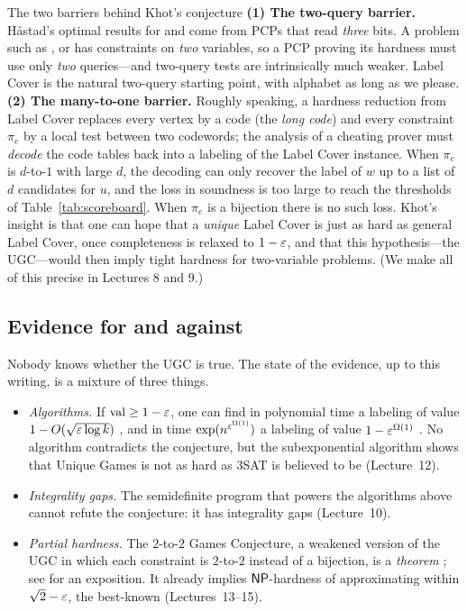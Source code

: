 \begin{bigpicture}{The two barriers behind Khot's conjecture}
\textbf{(1) The two-query barrier.}  H\aa stad's optimal results for  and  come
from PCPs that read \emph{three} bits.  A problem such as ,  or
 has constraints on \emph{two} variables, so a PCP proving its hardness
must use only \emph{two} queries---and two-query tests are intrinsically much weaker.
Label Cover is the natural two-query starting point, with alphabet as long as we please.
\textbf{(2) The many-to-one barrier.}  Roughly speaking, a hardness reduction from Label Cover replaces every vertex
by a code (the \emph{long code}) and every constraint $\pi_e$ by a local test between two codewords;
the analysis of a cheating prover must \emph{decode} the code tables back into a labeling of the
Label Cover instance.  When $\pi_e$ is $d$-to-$1$ with large $d$, the decoding can only recover the label of $w$
up to a list of $d$ candidates for $u$, and the loss in soundness is too large to reach
the thresholds of Table~\ref{tab:scoreboard}.  When $\pi_e$ is a bijection there is no such
loss.  Khot's insight \citep{Khot02} is that one can hope that a \emph{unique} Label Cover is just as hard as general Label Cover,
once completeness is relaxed to $1-\varepsilon$, and that this hypothesis---the UGC---would then imply tight
hardness for two-variable problems.  (We make all of this precise in Lectures 8 and 9.)
\end{bigpicture}

\subsection{Evidence for and against}

Nobody knows whether the UGC is true.  The state of the evidence, up to this
writing, is a mixture of three things.

\begin{itemize}
  \item \emph{Algorithms.}  If $\operatorname{val}\ge1-\varepsilon$, one can find in polynomial time a labeling of value $1-O(\sqrt{\varepsilon\log k})$
        \citep{CMM06}, and in time $\exp(n^{\varepsilon^{\Omega(1)}})$ a labeling of value $1-\varepsilon^{\Omega(1)}$ \citep{ABS15}.
        No algorithm contradicts the conjecture, but the subexponential algorithm shows that Unique Games
        is not as hard as $3$SAT is believed to be (Lecture~12).
  \item \emph{Integrality gaps.}  The semidefinite program that powers the algorithms above cannot
        refute the conjecture: it has integrality gaps \citep{KhotVishnoi15} (Lecture~10).
  \item \emph{Partial hardness.}  The $2$-to-$2$ Games Conjecture, a weakened version of the UGC in
        which each constraint is $2$-to-$2$ instead of a bijection, is a \emph{theorem}
        \citep{KMS17,DKKMS18,KMS18}; see \citet{Khot19} for an exposition.  It already implies
        $\mathsf{NP}$-hardness of approximating  within $\sqrt2-\varepsilon$, the best-known (Lectures~13--15).
\end{itemize}


